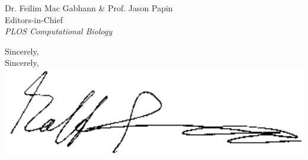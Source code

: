 \documentclass[11pt]{letter} %
\makeatletter
\renewcommand{\closing}[1]{\par\nobreak\vspace{\parskip}%
  \stopbreaks
  \noindent
  \ifx\@empty\fromaddress\else
  \hspace*{\longindentation}\fi
  \parbox{\indentedwidth}{\raggedright
  		 \ifx\@empty\fromsigimg
  		   \ignorespaces #1\\[6\medskipamount]%
  		 \else
  		   \ignorespaces #1\\\includegraphics[height=8\medskipamount]{./cover_letter_figs/ralf_signiture.png}
  		 \fi
       \ifx\@empty\fromsig
           \fromname
       \else \fromsig \fi\strut}%
   \par}
\makeatother
\begin{document}
\begin{letter}{Dr. Feilim Mac Gabhann \& Prof. Jason Papin \\ Editors-in-Chief \\ \emph{PLOS Computational Biology}}
\closing{Sincerely,}

\vspace{2\parskip} %




\end{letter}
 
\end{document}

